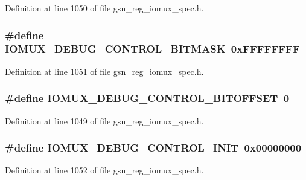 Definition at line 1050 of file gsn\_\-reg\_\-iomux\_\-spec.h.

\hypertarget{a00560_ad61ca29df44c1160914e6485a9e4d245}{
\subsubsection[{IOMUX\_\-DEBUG\_\-CONTROL\_\-BITMASK}]{\setlength{\rightskip}{0pt plus 5cm}\#define IOMUX\_\-DEBUG\_\-CONTROL\_\-BITMASK~0xFFFFFFFF}}
\label{a00560_ad61ca29df44c1160914e6485a9e4d245}


Definition at line 1051 of file gsn\_\-reg\_\-iomux\_\-spec.h.

\hypertarget{a00560_a2ccb900fcfaa191a7476be3482770a6e}{
\subsubsection[{IOMUX\_\-DEBUG\_\-CONTROL\_\-BITOFFSET}]{\setlength{\rightskip}{0pt plus 5cm}\#define IOMUX\_\-DEBUG\_\-CONTROL\_\-BITOFFSET~0}}
\label{a00560_a2ccb900fcfaa191a7476be3482770a6e}


Definition at line 1049 of file gsn\_\-reg\_\-iomux\_\-spec.h.

\hypertarget{a00560_a013396b06e323035b16743f975828db1}{
\subsubsection[{IOMUX\_\-DEBUG\_\-CONTROL\_\-INIT}]{\setlength{\rightskip}{0pt plus 5cm}\#define IOMUX\_\-DEBUG\_\-CONTROL\_\-INIT~0x00000000}}
\label{a00560_a013396b06e323035b16743f975828db1}


Definition at line 1052 of file gsn\_\-reg\_\-iomux\_\-spec.h.

